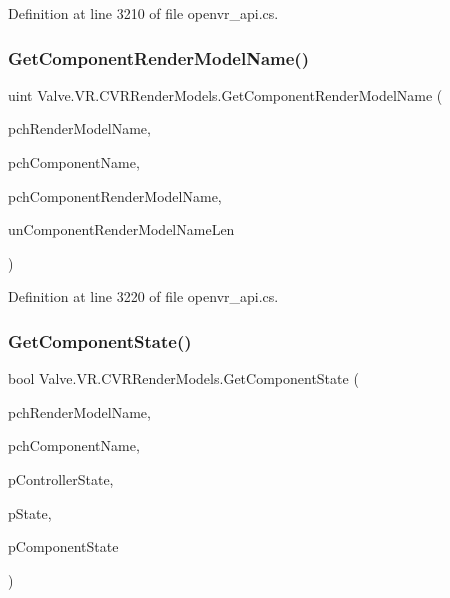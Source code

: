 Definition at line 3210 of file openvr\+\_\+api.\+cs.

\mbox{\label{class_valve_1_1_v_r_1_1_c_v_r_render_models_a1fb89266de3f332bc3c51b623943eb2d}} 
\subsubsection{\texorpdfstring{GetComponentRenderModelName()}{GetComponentRenderModelName()}}
{\footnotesize\ttfamily uint Valve.\+V\+R.\+C\+V\+R\+Render\+Models.\+Get\+Component\+Render\+Model\+Name (\begin{DoxyParamCaption}\item[{string}]{pch\+Render\+Model\+Name,  }\item[{string}]{pch\+Component\+Name,  }\item[{System.\+Text.\+String\+Builder}]{pch\+Component\+Render\+Model\+Name,  }\item[{uint}]{un\+Component\+Render\+Model\+Name\+Len }\end{DoxyParamCaption})}



Definition at line 3220 of file openvr\+\_\+api.\+cs.

\mbox{\label{class_valve_1_1_v_r_1_1_c_v_r_render_models_afda07fd17044f2e257525df29febea5a}} 
\subsubsection{\texorpdfstring{GetComponentState()}{GetComponentState()}}
{\footnotesize\ttfamily bool Valve.\+V\+R.\+C\+V\+R\+Render\+Models.\+Get\+Component\+State (\begin{DoxyParamCaption}\item[{string}]{pch\+Render\+Model\+Name,  }\item[{string}]{pch\+Component\+Name,  }\item[{ref \mbox{\hyperlink{struct_valve_1_1_v_r_1_1_v_r_controller_state__t}{V\+R\+Controller\+State\+\_\+t}}}]{p\+Controller\+State,  }\item[{ref \mbox{\hyperlink{struct_valve_1_1_v_r_1_1_render_model___controller_mode___state__t}{Render\+Model\+\_\+\+Controller\+Mode\+\_\+\+State\+\_\+t}}}]{p\+State,  }\item[{ref \mbox{\hyperlink{struct_valve_1_1_v_r_1_1_render_model___component_state__t}{Render\+Model\+\_\+\+Component\+State\+\_\+t}}}]{p\+Component\+State }\end{DoxyParamCaption})}



